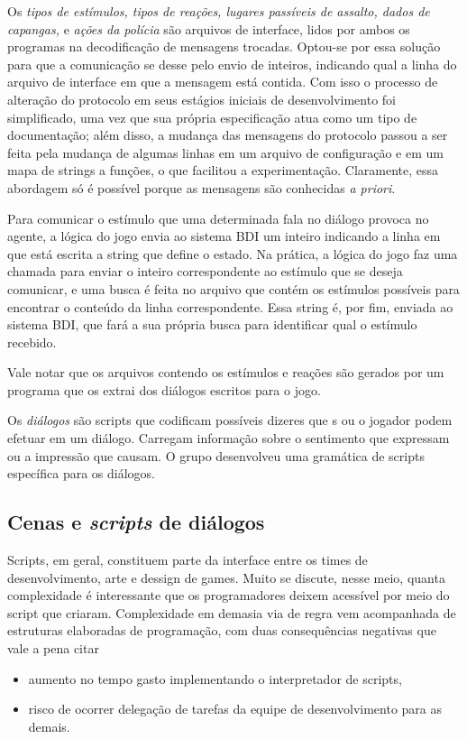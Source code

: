Os \emph{tipos de estímulos, tipos de reações, lugares passíveis de assalto, dados de capangas,} e \emph{ações da polícia} são arquivos de interface, lidos por ambos os programas na decodificação de mensagens trocadas. Optou-se por essa solução para que a comunicação se desse pelo envio de inteiros, indicando qual a linha do arquivo de interface
em que a mensagem está contida. Com isso o processo de alteração do protocolo em seus estágios iniciais de desenvolvimento foi simplificado, uma vez que sua própria especificação atua como um tipo de documentação; além disso, a mudança das mensagens do protocolo passou a ser feita pela mudança de algumas linhas em um arquivo de configuração e em um mapa de strings a funções, o que facilitou a experimentação. Claramente, essa abordagem só é
possível porque as mensagens são conhecidas \emph{a priori}.

Para comunicar o estímulo que uma determinada fala no diálogo provoca
no agente, a lógica do jogo envia ao sistema BDI um inteiro indicando
a linha em que está escrita a string que define o estado. Na prática,
a lógica do jogo faz uma chamada para enviar o inteiro correspondente
ao estímulo que se deseja comunicar, e uma busca é feita no arquivo
que contém os estímulos possíveis para encontrar o conteúdo da linha
correspondente. Essa string é, por fim, enviada ao sistema BDI, que
fará a sua própria busca para identificar qual o estímulo recebido.

Vale notar que os arquivos contendo os estímulos e reações são gerados por um programa que os extrai dos diálogos escritos para o jogo.

Os \emph{diálogos} são scripts que codificam possíveis dizeres que
\npc{}s ou o jogador podem efetuar em um diálogo. Carregam informação sobre
o sentimento que expressam ou a impressão que causam. 
O grupo desenvolveu uma gramática de scripts específica para os diálogos.

\subsection{Cenas e \emph{scripts} de diálogos}
Scripts, em geral, constituem parte da interface entre os times de
desenvolvimento, arte e dessign de games. Muito se discute, nesse
meio, quanta complexidade é interessante que os programadores deixem
acessível por meio do script que criaram. Complexidade em demasia via
de regra vem acompanhada de estruturas elaboradas de programação, com
duas consequências negativas que vale a pena citar
\begin{itemize}
\item aumento no tempo gasto implementando o interpretador de scripts,
\item risco de ocorrer delegação de tarefas da equipe de
  desenvolvimento para as demais.
\end{itemize}

